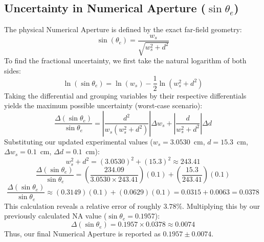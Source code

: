 \subsection{Uncertainty in Numerical Aperture ($\sin\theta_e$)}
The physical Numerical Aperture is defined by the exact far-field geometry:
\begin{equation}
    \sin(\theta_e) = \frac{w_s}{\sqrt{w_s^2 + d^2}}
\end{equation}
To find the fractional uncertainty, we first take the natural logarithm of both sides:
\begin{equation}
    \ln(\sin\theta_e) = \ln(w_s) - \frac{1}{2}\ln(w_s^2 + d^2)
\end{equation}
Taking the differential and grouping variables by their respective differentials yields the maximum possible uncertainty (worst-case scenario):
\begin{equation}
    \frac{\Delta(\sin\theta_e)}{\sin\theta_e} = \left| \frac{d^2}{w_s(w_s^2 + d^2)} \right| \Delta w_s + \left| \frac{d}{w_s^2 + d^2} \right| \Delta d
\end{equation}
Substituting our updated experimental values ($w_s = 3.0530$~cm, $d = 15.3$~cm, $\Delta w_s = 0.1$~cm, $\Delta d = 0.1$~cm):
\begin{equation}
    w_s^2 + d^2 = (3.0530)^2 + (15.3)^2 \approx 243.41
\end{equation}
\begin{equation}
    \frac{\Delta(\sin\theta_e)}{\sin\theta_e} = \left( \frac{234.09}{3.0530 \times 243.41} \right)(0.1) + \left( \frac{15.3}{243.41} \right)(0.1)
\end{equation}
\begin{equation}
    \frac{\Delta(\sin\theta_e)}{\sin\theta_e} \approx (0.3149)(0.1) + (0.0629)(0.1) = 0.0315 + 0.0063 = 0.0378
\end{equation}
This calculation reveals a relative error of roughly $3.78\%$. Multiplying this by our previously calculated NA value ($\sin\theta_e = 0.1957$):
\begin{equation}
    \Delta(\sin\theta_e) = 0.1957 \times 0.0378 \approx 0.0074
\end{equation}
Thus, our final Numerical Aperture is reported as $0.1957 \pm 0.0074$.


